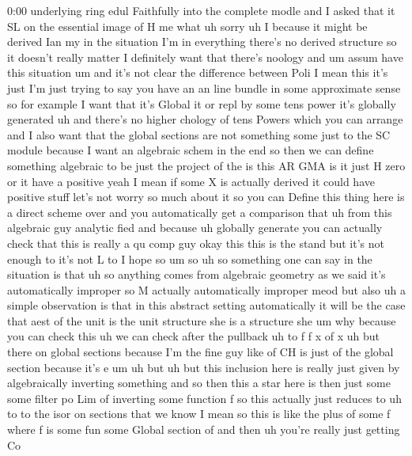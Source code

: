 \begin{unfinished}{0:00}
underlying  ring  edul  Faithfully  into  the
complete
modle  and  I  asked  that  it  SL  on  the
essential  image
of  H
me  what  uh  sorry
uh  I  because  it  might  be  derived  Ian  my
in  the  situation  I'm  in  everything
there's  no  derived  structure  so  it
doesn't  really  matter
I  definitely  want  that  there's  noology
and
um  assum  have  this  situation  um  and  it's
not  clear  the  difference  between
Poli  I  mean  this  it's  just  I'm  just
trying  to  say  you  have  an  an  line  bundle
in  some  approximate  sense  so  for  example
I  want  that  it's  Global  it  or  repl  by
some  tens  power  it's  globally  generated
uh  and  there's  no  higher  chology  of  tens
Powers  which  you  can  arrange  and  I  also
want  that  the  global  sections  are  not
something  some  just  to  the  SC  module
because  I  want  an  algebraic  schem  in  the
end  so  then  we  can
define  something  algebraic  to  be  just
the
project  of  the
is  this  AR
GMA  is  it  just  H  zero  or  it  have  a
positive  yeah  I  mean  if  some  X  is
actually  derived  it  could  have  positive
stuff  let's  not  worry  so  much  about
it  so  you  can  Define  this  thing  here  is
a  direct  scheme
over
and  you  automatically  get  a  comparison
that  uh  from  this  algebraic  guy  analytic
fied  and
because  uh
globally  generate  you  can  actually  check
that  this  is  really  a  qu  comp
guy  okay  this  this  is  the
stand
but  it's  not  enough  to  it's
not  L
to  I  hope
so
um
so  uh  so  something  one  can  say  in  the
situation  is
that  uh  so  anything  comes  from  algebraic
geometry  as  we  said  it's  automatically
improper  so  M  actually  automatically
improper
meod  but  also  uh  a  simple  observation  is
that  in  this  abstract
setting  automatically  it  will  be  the
case  that
aest  of  the  unit  is  the
unit  structure  she  is  a  structure
she  um
why  because  you  can  check  this
uh  we  can  check  after  the
pullback  uh
to
f
f
x  of
x  uh  but  there  on  global
sections
because  I'm  the  fine
guy  like  of  CH  is  just  of  the  global
section  because  it's  e
um  uh  but
uh  but  this  inclusion  here  is  really
just  given  by  algebraically  inverting
something  and  so  then  this  a  star  here
is  then  just  some  some  filter  po  Lim  of
inverting  some  function  f  so  this
actually  just  reduces  to  uh  to  to  the
isor  on  sections  that  we
know  I  mean  so  this  is  like  the  plus  of
some  f  where  f  is  some  fun  some  Global
section  of
and
then  uh  you're  really  just
getting  Co

\end{unfinished}
